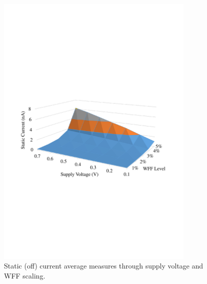 \documentclass[pgmicro,diss,english]{iiufrgs}
\begin{document}
    \begin{figure}[t]
        \centering
            \includegraphics[width=0.85\textwidth, trim={1.25cm 9cm 2cm 11cm}, clip]{staticCurrAbs.pdf}
            \caption{Static (off) current average measures through supply voltage and WFF scaling.}
        \label{fig:StatCurrAbs}
    \end{figure}
\end{document}
